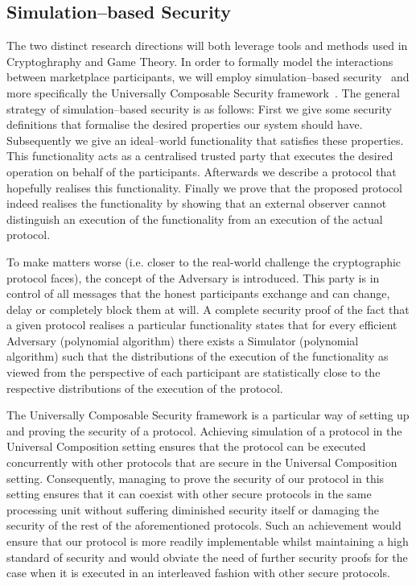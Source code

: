 \subsection{Simulation--based Security}
  The two distinct research directions will both leverage tools and methods used in
  Cryptoghraphy and Game Theory. In order to formally model the interactions between
  marketplace participants, we will employ simulation--based security~\cite{simulate}
  and more specifically the Universally Composable Security framework~\cite{uc}. The
  general strategy of simulation--based security is as follows: First we give some
  security definitions that formalise the desired properties our system should have.
  Subsequently we give an ideal--world functionality that satisfies these properties.
  This functionality acts as a centralised trusted party that executes the desired
  operation on behalf of the participants. Afterwards we describe a protocol that
  hopefully realises this functionality. Finally we prove that the proposed protocol
  indeed realises the functionality by showing that an external observer cannot
  distinguish an execution of the functionality from an execution of the actual
  protocol.

  To make matters worse (i.e. closer to the real-world challenge the cryptographic
  protocol faces), the concept of the Adversary is introduced. This party is in control
  of all messages that the honest participants exchange and can change, delay or
  completely block them at will. A complete security proof of the fact that a given
  protocol realises a particular functionality states that for every efficient Adversary
  (polynomial algorithm) there exists a Simulator (polynomial algorithm) such that the
  distributions of the execution of the functionality as viewed from the perspective of
  each participant are statistically close to the respective distributions of the
  execution of the protocol.

  The Universally Composable Security framework is a particular way of setting up and
  proving the security of a protocol. Achieving simulation of a protocol in the
  Universal Composition setting ensures that the protocol can be executed concurrently
  with other protocols that are secure in the Universal Composition setting.
  Consequently, managing to prove the security of our protocol in this setting ensures
  that it can coexist with other secure protocols in the same processing unit without
  suffering diminished security itself or damaging the security of the rest of the
  aforementioned protocols. Such an achievement would ensure that our protocol is more
  readily implementable whilst maintaining a high standard of security and would obviate
  the need of further security proofs for the case when it is executed in an interleaved
  fashion with other secure protocols.
